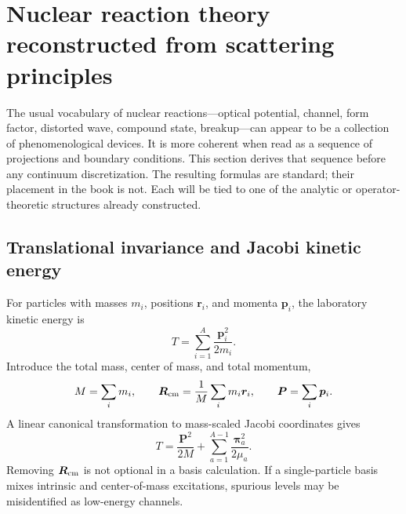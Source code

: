 \section{Nuclear reaction theory reconstructed from scattering principles}
\label{sec:nuclear-reaction-foundations}

The usual vocabulary of nuclear reactions---optical potential, channel,
form factor, distorted wave, compound state, breakup---can appear to be a
collection of phenomenological devices.  It is more coherent when read as a
sequence of projections and boundary conditions.  This section derives that
sequence before any continuum discretization.  The resulting formulas are
standard; their placement in the book is not.  Each will be tied to one of the
analytic or operator-theoretic structures already constructed.

\subsection{Translational invariance and Jacobi kinetic energy}
\label{subsec:nuclear-jacobi-foundations}

For particles with masses $m_i$, positions $\bm r_i$, and momenta $\bm p_i$,
the laboratory kinetic energy is
\begin{equation}
  T=\sum_{i=1}^{A}\frac{\bm p_i^2}{2m_i}.
  \label{eq:many-body-lab-kinetic}
\end{equation}
Introduce the total mass, center of mass, and total momentum,
\begin{equation}
  M=\sum_i m_i,
  \qquad
  \bm R_{\mathrm{cm}}=\frac{1}{M}\sum_i m_i\bm r_i,
  \qquad
  \bm P=\sum_i\bm p_i.
  \label{eq:many-body-cm}
\end{equation}
A linear canonical transformation to mass-scaled Jacobi coordinates gives
\begin{equation}
  T=\frac{\bm P^2}{2M}+
  \sum_{a=1}^{A-1}\frac{\bm\pi_a^2}{2\mu_a}.
  \label{eq:jacobi-kinetic-decomposition}
\end{equation}
Removing $\bm R_{\mathrm{cm}}$ is not optional in a basis calculation.  If a
single-particle basis mixes intrinsic and center-of-mass excitations, spurious
levels may be misidentified as low-energy channels.

